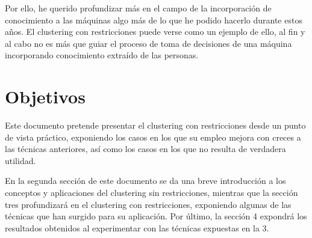 Por ello, he querido profundizar más en el campo de la incorporación de conocimiento a las máquinas algo más de lo que he podido hacerlo durante estos años. El clustering con restricciones puede verse como un ejemplo de ello, al fin y al cabo no es más que guiar el proceso de toma de decisiones de una máquina incorporando conocimiento extraído de las personas.

\section{Objetivos}

Este documento pretende presentar el clustering con restricciones desde un punto de vista práctico, exponiendo los casos en los que su empleo mejora con creces a las técnicas anteriores, así como los casos en los que no resulta de verdadera utilidad.

En la segunda sección de este documento se da una breve introducción a los conceptos y aplicaciones del clustering sin restricciones, mientras que la sección tres profundizará en el clustering con restricciones, exponiendo algunas de las técnicas que han surgido para su aplicación. Por último, la sección 4 expondrá los resultados obtenidos al experimentar con las técnicas expuestas en la 3.

\let\cleardoublepage\relax
































